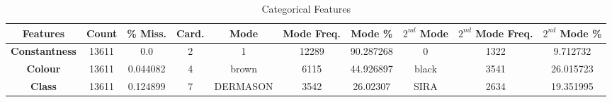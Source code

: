\documentclass[10pt, conference]{IEEEtran}
\begin{document}
\begin{table}[h!]
    \caption{Categorical Features}
    \begin{center}
    \begin{tabular}{|c||c|c|c|c|c|c|c|c|c|}
        \hline
        \textbf{Features}&\textbf{Count}&\textbf{\% Miss.}&\textbf{Card.}&\textbf{Mode}&\textbf{Mode Freq.}&\textbf{Mode \%}&\textbf{$2^{nd}$ Mode}&\textbf{$2^{nd}$ Mode Freq.}&\textbf{$2^{nd}$ Mode \%}\\
        \hline
        \textbf{Constantness}       &13611  &0.0       &2       &1        &12289      &90.287268     &0          &1322         &9.712732\\
        \textbf{Colour}             &13611  &0.044082  &4       &brown    &6115       &44.926897    &black      &3541          &26.015723\\
        \textbf{Class}              &13611  &0.124899  &7       &DERMASON &3542       &26.02307     &SIRA       &2634          &19.351995\\

        \hline
    \end{tabular}
    \label{tab:categorical features}
    \end{center}
\end{table}

\begin{figure}[H]
\end{figure}
\begin{figure}[H]
\end{figure}
\begin{figure}[H]
\end{figure}
\begin{figure}[H]
\end{figure}
\begin{figure}[H]
\end{figure}
\begin{figure}[H]
\end{figure}
\begin{figure}[H]
\end{figure}
\begin{figure}[H]
\end{figure}
\begin{figure}[H]
\end{figure}

\noindent
\end{document}
